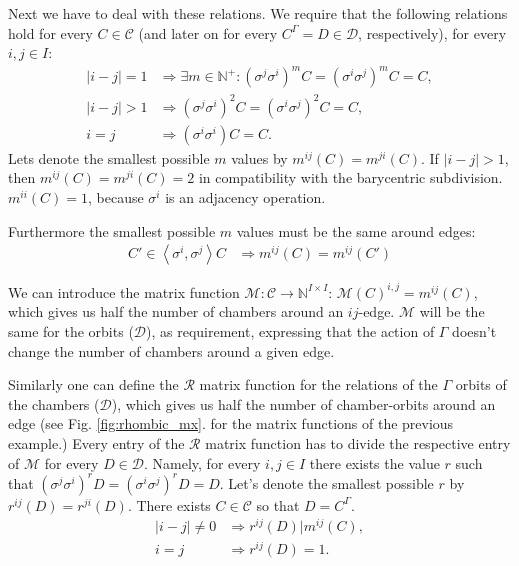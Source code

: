 \documentclass[12pt,a4paper]{article}
\numberwithin{equation}{section}
\theoremstyle{plain}%
\theoremstyle{definition}
\theoremstyle{remark}
\newtheorem*{note}{Note}
\begin{document}

Next we have to deal with these relations. We require that the following
relations hold for every $C\in\mathcal{C}$ (and later on for every
$C^\Gamma=D\in\mathcal{D}$, respectively), for every $i,j\in I$:
\begin{align}
  \label{eqn:mxfun_constraint_begin}|i-j|=1 & \Rightarrow \exists m\in\mathbb{N}^+: (\sigma^j\sigma^i)^mC=(\sigma^i\sigma^j)^mC=C, \\
  |i-j|>1 & \Rightarrow (\sigma^j\sigma^i)^2C=(\sigma^i\sigma^j)^2C=C, \\
  i=j & \Rightarrow (\sigma^i\sigma^i)C=C.
\end{align}
Lets denote the smallest possible $m$ values by $m^{ij}(C)=m^{ji}(C)$.
If $|i-j|>1$, then $m^{ij}(C)=m^{ji}(C)=2$ in compatibility with the barycentric subdivision.  
$m^{ii}(C)=1$, because $\sigma^i$ is an adjacency operation.

Furthermore the smallest possible $m$ values must be the same around edges:
\begin{align}
  C'\in \left<\sigma^i,\sigma^j\right>C & \Rightarrow m^{ij}(C)=m^{ij}(C')
\end{align}

We can introduce the matrix function $\mathcal{M}: \mathcal{C}
\rightarrow \mathbb{N}^{I\times I}$: $\mathcal{M}(C)^{i,j}=m^{ij}(C)$, which
gives us half the number of chambers around an $ij$-edge. $\mathcal{M}$
will be the same for the orbits ($\mathcal{D}$), as requirement, expressing that
the action of $\Gamma$ doesn't change the number of chambers around a given
edge.

Similarly one can define the $\mathcal{R}$ matrix function for the
relations of the $\Gamma$ orbits of the chambers ($\mathcal{D}$), which gives us
half the number of chamber-orbits around an edge (see Fig. \ref{fig:rhombic_mx}.
for the matrix functions of the previous example.) Every entry of the $\mathcal{R}$
matrix function has to divide the respective entry of $\mathcal{M}$ for
every $D\in\mathcal{D}$. Namely, for every $i,j\in I$ there exists the value $r$ such that
$(\sigma^j\sigma^i)^rD=(\sigma^i\sigma^j)^rD=D$. Let's denote the smallest
possible $r$ by $r^{ij}(D)=r^{ji}(D)$. There exists $C\in\mathcal{C}$ so
that $D=C^\Gamma$.
\begin{align}
  |i-j|\ne0 & \Rightarrow r^{ij}(D)|m^{ij}(C), \\
  \label{eqn:mxfun_constraint_end}i=j & \Rightarrow r^{ij}(D)=1.
\end{align}
\end{document}
